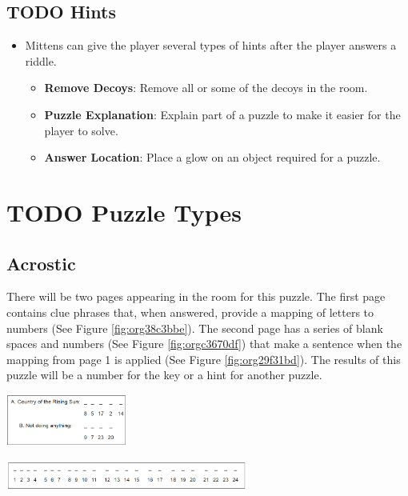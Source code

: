 \documentclass[11pt]{article}
\begin{document}
\subsection{{\bfseries\sffamily TODO} Hints}
\label{sec:org888a0e2}
\begin{itemize}
\item Mittens can give the player several types of hints after the player answers a riddle.
\begin{itemize}
\item \textbf{Remove Decoys}: Remove all or some of the decoys in the room.
\item \textbf{Puzzle Explanation}: Explain part of a puzzle to make it easier for the player to solve.
\item \textbf{Answer Location}: Place a glow on an object required for a puzzle.
\end{itemize}
\end{itemize}

\section{{\bfseries\sffamily TODO} Puzzle Types}
\label{sec:org65dad88}
\subsection{Acrostic}
\label{sec:orgf51ebb2}
There will be two pages appearing in the room for this puzzle. The first page contains clue phrases that, when answered, provide a mapping of letters to numbers (See Figure \ref{fig:org38c3bbe}). The second page has a series of blank spaces and numbers (See Figure \ref{fig:orgc3670df}) that make a sentence when the mapping from page 1 is applied (See Figure \ref{fig:org29f31bd}). The results of this puzzle will be a number for the key or a hint for another puzzle.

\begin{center}
\includegraphics[width=4cm]{./img/acrostic-1.png}
\end{center}

\begin{center}
\includegraphics[width=8cm]{./img/acrostic-2.png}
\end{center}
\end{document}
